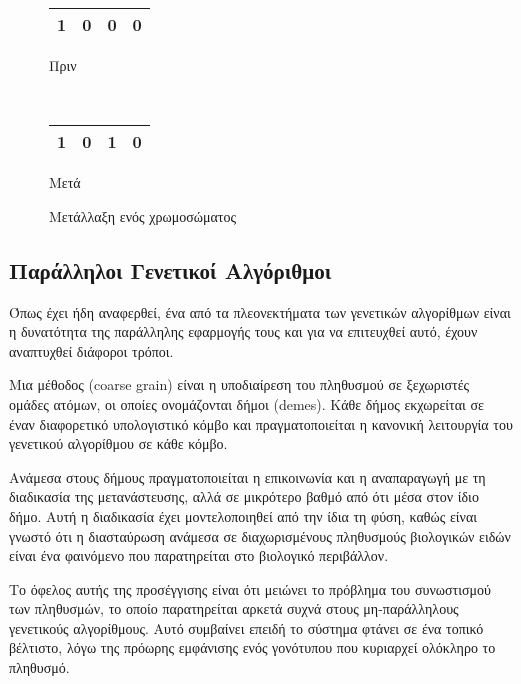 \begin{figure}[!t]
    \centering
    \begin{subtable}[b]{.4\linewidth}
        \centering
        \begin{tabular}{|c|c|c|c|}
            \hline
            1 & 0 & \cellcolor{gray!25}0 & 0\\
            \hline
        \end{tabular}
        \caption{Πριν}
        \label{fig_beforeMutation}
    \end{subtable}
    ~
    \begin{subtable}[b]{.3\linewidth}
        \centering
        \begin{tabular}{|c|c|c|c|}
            \hline
            1 & 0 & \cellcolor{gray!25}1 & 0\\
            \hline
        \end{tabular}
        \caption{Μετά}
        \label{fig_afterMutation}
    \end{subtable}
    \caption{Μετάλλαξη ενός χρωμοσώματος}
    \label{fig_mutation}
\end{figure}

\subsection{Παράλληλοι Γενετικοί Αλγόριθμοι}

Όπως έχει ήδη αναφερθεί, ένα από τα πλεονεκτήματα των γενετικών αλγορίθμων είναι η δυνατότητα της παράλληλης εφαρμογής τους και για να επιτευχθεί αυτό, έχουν αναπτυχθεί διάφοροι τρόποι.

Μια μέθοδος (coarse grain) είναι η υποδιαίρεση του πληθυσμού σε ξεχωριστές ομάδες ατόμων, οι οποίες ονομάζονται δήμοι (demes). Κάθε δήμος εκχωρείται σε έναν διαφορετικό υπολογιστικό κόμβο και πραγματοποιείται η κανονική λειτουργία του γενετικού αλγορίθμου σε κάθε κόμβο. \cite{Oravec2009}

Ανάμεσα στους δήμους πραγματοποιείται η επικοινωνία και η αναπαραγωγή με τη διαδικασία της μετανάστευσης, αλλά σε μικρότερο βαθμό από ότι μέσα στον ίδιο δήμο. Αυτή η διαδικασία έχει μοντελοποιηθεί από την ίδια τη φύση, καθώς είναι γνωστό ότι η διασταύρωση ανάμεσα σε διαχωρισμένους πληθυσμούς βιολογικών ειδών είναι ένα φαινόμενο που παρατηρείται στο βιολογικό περιβάλλον.

Το όφελος αυτής της προσέγγισης είναι ότι μειώνει το πρόβλημα του συνωστισμού των πληθυσμών, το οποίο παρατηρείται αρκετά συχνά στους μη-παράλληλους γενετικούς αλγορίθμους. Αυτό συμβαίνει επειδή το σύστημα φτάνει σε ένα τοπικό βέλτιστο, λόγω της πρόωρης εμφάνισης ενός γονότυπου που κυριαρχεί ολόκληρο το πληθυσμό.


